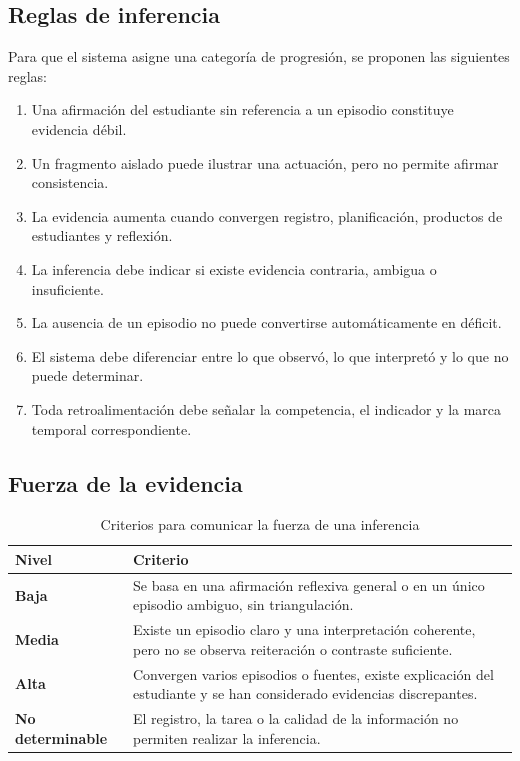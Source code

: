 \documentclass[11pt,a4paper]{article}
\begin{document}
\subsection{Reglas de inferencia}

Para que el sistema asigne una categoría de progresión, se proponen las siguientes reglas:

\begin{enumerate}
    \item Una afirmación del estudiante sin referencia a un episodio constituye evidencia débil.
    \item Un fragmento aislado puede ilustrar una actuación, pero no permite afirmar consistencia.
    \item La evidencia aumenta cuando convergen registro, planificación, productos de estudiantes y reflexión.
    \item La inferencia debe indicar si existe evidencia contraria, ambigua o insuficiente.
    \item La ausencia de un episodio no puede convertirse automáticamente en déficit.
    \item El sistema debe diferenciar entre lo que observó, lo que interpretó y lo que no puede determinar.
    \item Toda retroalimentación debe señalar la competencia, el indicador y la marca temporal correspondiente.
\end{enumerate}

\subsection{Fuerza de la evidencia}

\begin{table}[ht]
\centering
\caption{Criterios para comunicar la fuerza de una inferencia}
\begin{tabularx}{\textwidth}{>{\bfseries}p{2.5cm}X}
\toprule
Nivel & Criterio\\
\midrule
Baja &
Se basa en una afirmación reflexiva general o en un único episodio ambiguo, sin triangulación.\\
Media &
Existe un episodio claro y una interpretación coherente, pero no se observa reiteración o contraste suficiente.\\
Alta &
Convergen varios episodios o fuentes, existe explicación del estudiante y se han considerado evidencias discrepantes.\\
No determinable &
El registro, la tarea o la calidad de la información no permiten realizar la inferencia.\\
\bottomrule
\end{tabularx}
\end{table}
\end{document}
